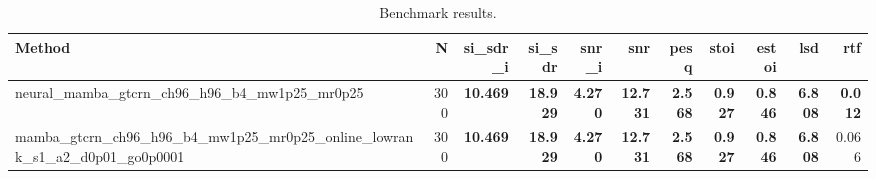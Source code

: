 \begin{table}[t]
\centering
\caption{Benchmark results.}
\label{tab:bench}
\begin{tabular}{lrrrrrrrrrr}
\toprule
Method & N & si\_sdr\_i & si\_sdr & snr\_i & snr & pesq & stoi & estoi & lsd & rtf \\
\midrule
neural_mamba_gtcrn_ch96_h96_b4_mw1p25_mr0p25 & 300 & \textbf{10.469} & \textbf{18.929} & \textbf{4.270} & \textbf{12.731} & \textbf{2.568} & \textbf{0.927} & \textbf{0.846} & \textbf{6.808} & \textbf{0.012} \\
mamba_gtcrn_ch96_h96_b4_mw1p25_mr0p25_online_lowrank_s1_a2_d0p01_go0p0001 & 300 & \textbf{10.469} & \textbf{18.929} & \textbf{4.270} & \textbf{12.731} & \textbf{2.568} & \textbf{0.927} & \textbf{0.846} & \textbf{6.808} & 0.066 \\
\bottomrule
\end{tabular}
\end{table}